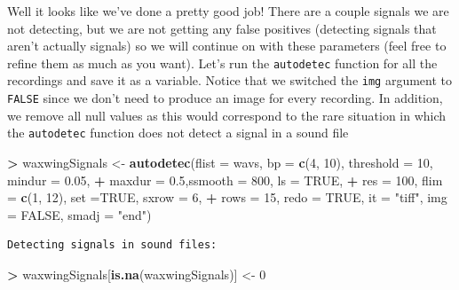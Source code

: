 \documentclass[]{krantz}
\makeatletter
\newenvironment{Shaded}{\begin{snugshade}}{\end{snugshade}}
\newcommand{\KeywordTok}[1]{\textcolor[rgb]{0.27,0.27,0.27}{\textbf{#1}}}
\newcommand{\DataTypeTok}[1]{\textcolor[rgb]{0.27,0.27,0.27}{#1}}
\newcommand{\DecValTok}[1]{\textcolor[rgb]{0.06,0.06,0.06}{#1}}
\newcommand{\FloatTok}[1]{\textcolor[rgb]{0.06,0.06,0.06}{#1}}
\newcommand{\StringTok}[1]{\textcolor[rgb]{0.5,0.5,0.5}{#1}}
\newcommand{\OtherTok}[1]{\textcolor[rgb]{0.37,0.37,0.37}{#1}}
\newcommand{\OperatorTok}[1]{\textcolor[rgb]{0.43,0.43,0.43}{\textbf{#1}}}
\newcommand{\NormalTok}[1]{#1}
\newenvironment{kframe}{%
\medskip{}
\setlength{\fboxsep}{.8em}
 \def\at@end@of@kframe{}%
 \ifinner\ifhmode%
  \def\at@end@of@kframe{\end{minipage}}%
  \begin{minipage}{\columnwidth}%
 \fi\fi%
 \def\FrameCommand##1{\hskip\@totalleftmargin \hskip-\fboxsep
 \colorbox{shadecolor}{##1}\hskip-\fboxsep
     \hskip-\linewidth \hskip-\@totalleftmargin \hskip\columnwidth}%
 \MakeFramed {\advance\hsize-\width
   \@totalleftmargin\z@ \linewidth\hsize
   \@setminipage}}%
 {\par\unskip\endMakeFramed%
 \at@end@of@kframe}
\renewenvironment{Shaded}{\begin{kframe}}{\end{kframe}}
\makeatother
\begin{document}
Well it looks like we've done a pretty good job! There are a couple
signals we are not detecting, but we are not getting any false positives
(detecting signals that aren't actually signals) so we will continue on
with these parameters (feel free to refine them as much as you want).
Let's run the \texttt{autodetec} function for all the recordings and
save it as a variable. Notice that we switched the \texttt{img} argument
to \texttt{FALSE} since we don't need to produce an image for every
recording. In addition, we remove all null values as this would
correspond to the rare situation in which the \texttt{autodetec}
function does not detect a signal in a sound file

\begin{Shaded}
\begin{Highlighting}[]
\OperatorTok{>}\StringTok{ }\NormalTok{waxwingSignals <-}\StringTok{ }\KeywordTok{autodetec}\NormalTok{(}\DataTypeTok{flist =}\NormalTok{ wavs, }\DataTypeTok{bp =} \KeywordTok{c}\NormalTok{(}\DecValTok{4}\NormalTok{, }\DecValTok{10}\NormalTok{), }\DataTypeTok{threshold =} \DecValTok{10}\NormalTok{, }\DataTypeTok{mindur =} \FloatTok{0.05}\NormalTok{, }
\OperatorTok{+}\StringTok{           }\DataTypeTok{maxdur =} \FloatTok{0.5}\NormalTok{,}\DataTypeTok{ssmooth =} \DecValTok{800}\NormalTok{, }\DataTypeTok{ls =} \OtherTok{TRUE}\NormalTok{, }
\OperatorTok{+}\StringTok{           }\DataTypeTok{res =} \DecValTok{100}\NormalTok{, }\DataTypeTok{flim =} \KeywordTok{c}\NormalTok{(}\DecValTok{1}\NormalTok{, }\DecValTok{12}\NormalTok{), }\DataTypeTok{set =}\OtherTok{TRUE}\NormalTok{, }\DataTypeTok{sxrow =} \DecValTok{6}\NormalTok{, }
\OperatorTok{+}\StringTok{           }\DataTypeTok{rows =} \DecValTok{15}\NormalTok{, }\DataTypeTok{redo =} \OtherTok{TRUE}\NormalTok{, }\DataTypeTok{it =} \StringTok{"tiff"}\NormalTok{, }\DataTypeTok{img =} \OtherTok{FALSE}\NormalTok{, }\DataTypeTok{smadj =} \StringTok{"end"}\NormalTok{)}
\end{Highlighting}
\end{Shaded}

\begin{verbatim}
Detecting signals in sound files:
\end{verbatim}

\begin{Shaded}
\begin{Highlighting}[]
\OperatorTok{>}\StringTok{ }\NormalTok{waxwingSignals[}\KeywordTok{is.na}\NormalTok{(waxwingSignals)] <-}\StringTok{ }\DecValTok{0}
\end{Highlighting}
\end{Shaded}
\end{document}
